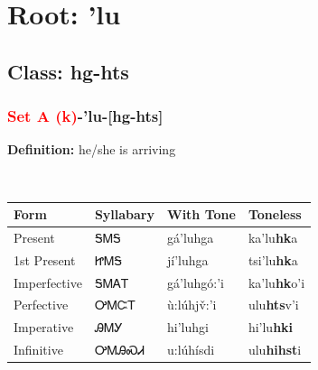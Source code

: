 \needspace{4in}
\section*{Root: 'lu}
\nopagebreak
{}
\needspace{3in}
\subsection*{Class: hg-hts}
\nopagebreak
\needspace{2in}
\subsubsection*{\textcolor{Red}{Set A (k)}{-}\textbf{'lu}{-}[hg-hts]}
\nopagebreak
\textbf{Definition: } he/she is arriving
\\[0.5em]
\begin{tabularx}{\textwidth}{l X X X}%
\toprule%
\textbf{Form}&\textbf{Syllabary}&\textbf{With Tone}&\textbf{Toneless}\\%
\midrule%
Present&ᎦᎷᎦ&gá’luhga&ka'lu\textbf{hk}a\\%
1st Present&ᏥᎷᎦ&jí’luhga&tsi'lu\textbf{hk}a\\%
Imperfective&ᎦᎷᎪᎢ&gá’luhgó:’i&ka'lu\textbf{hk}o'i\\%
Perfective&ᎤᎷᏨᎢ&ù:lúhjv̌:’i&ulu\textbf{hts}v'i\\%
Imperative&ᎯᎷᎩ&hi’luhgi&hi'lu\textbf{hki}\\%
Infinitive&ᎤᎷᎯᏍᏗ&u:lúhísdi&ulu\textbf{hihst}i\\%
\bottomrule%
\end{tabularx}
\\[1em]